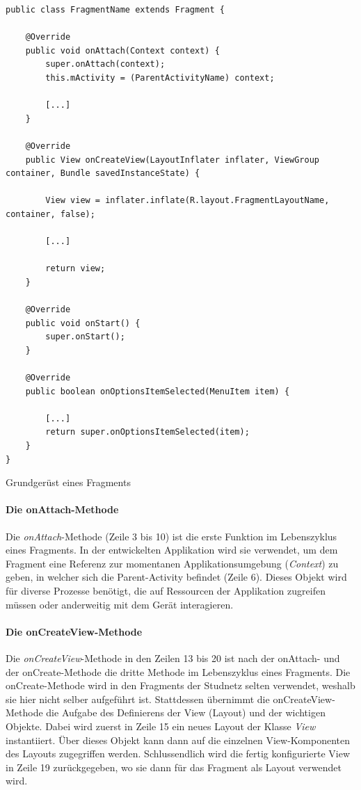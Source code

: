 \documentclass[../main.tex]{subfiles}
\begin{document}
	\begin{code}
		\begin{center}
			\begin{verbatim}
public class FragmentName extends Fragment {
			
	@Override
	public void onAttach(Context context) {
		super.onAttach(context);
		this.mActivity = (ParentActivityName) context;
		
		[...]
	}
	
	@Override
	public View onCreateView(LayoutInflater inflater, ViewGroup container, Bundle savedInstanceState) {
	
		View view = inflater.inflate(R.layout.FragmentLayoutName, container, false);

		[...]
		
		return view;
	}
			
	@Override
	public void onStart() {
		super.onStart();
	}
			
	@Override
	public boolean onOptionsItemSelected(MenuItem item) {
			
		[...]
		return super.onOptionsItemSelected(item);
	}
}	
			\end{verbatim}
			\caption{Grundgerüst eines Fragments}
			\label{fragmentStructure}
		\end{center}
		
	\end{code}

	\paragraph{Die onAttach-Methode}
	Die \emph{onAttach}-Methode (Zeile 3 bis 10) ist die erste Funktion im Lebenszyklus eines Fragments. In der entwickelten Applikation wird sie verwendet, um dem Fragment eine Referenz zur momentanen Applikationsumgebung (\emph{Context}) zu geben, in welcher sich die Parent-Activity befindet (Zeile 6). Dieses Objekt wird für diverse Prozesse benötigt, die auf Ressourcen der Applikation zugreifen müssen oder anderweitig mit dem Gerät interagieren. \cite{context}
	
	\paragraph{Die onCreateView-Methode}
	Die \emph{onCreateView}-Methode in den Zeilen 13 bis 20 ist nach der onAttach- und der onCreate-Methode die dritte Methode im Lebenszyklus eines Fragments. Die onCreate-Methode wird in den Fragments der Studnetz selten verwendet, weshalb sie hier nicht selber aufgeführt ist. Stattdessen übernimmt die onCreateView-Methode die Aufgabe des Definierens der View (Layout) und der wichtigen Objekte. Dabei wird zuerst in Zeile 15 ein neues Layout der Klasse \emph{View} instantiiert. Über dieses Objekt kann dann auf die einzelnen View-Komponenten des Layouts zugegriffen werden. Schlussendlich wird die fertig konfigurierte View in Zeile 19 zurückgegeben, wo sie dann für das Fragment als Layout verwendet wird.
	
\end{document}
